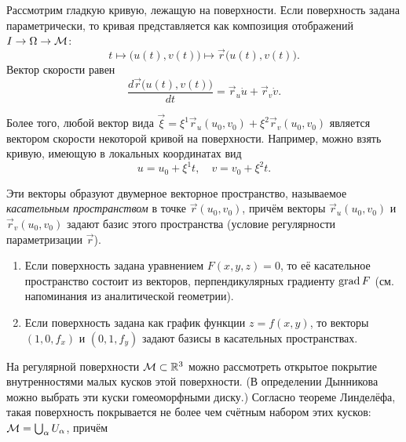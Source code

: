 Рассмотрим гладкую кривую, лежащую на поверхности. Если поверхность задана параметрически, то кривая представляется как композиция отображений $I \to \Omega \to \mathcal{M}$:
\[
	t \mapsto \big(u(t), v(t)\big) \mapsto \vec{r}\big(u(t), v(t)\big).
\]
Вектор скорости равен
\[
	\frac{d\vec{r}\big(u(t), v(t)\big)}{dt} = \vec{r}_u\dot{u} + \vec{r}_v\dot{v}.
\]

Более того, любой вектор вида $\vec{\xi} = \xi^1\vec{r}_u(u_0, v_0) + \xi^2\vec{r}_v(u_0, v_0)$ является вектором скорости некоторой кривой на поверхности. Например, можно взять кривую, имеющую в локальных координатах вид
\[
	u = u_0 + \xi^1t,\quad v = v_0 + \xi^2t.
\]

Эти векторы образуют двумерное векторное пространство, называемое \textit{касательным пространством} в точке $\vec{r}(u_0, v_0)$, причём векторы $\vec{r}_u(u_0, v_0)$ и $\vec{r}_v(u_0, v_0)$ задают базис этого пространства (условие регулярности параметризации $\vec{r}$).

\begin{example}
	\begin{enumerate}[nolistsep, label=(\arabic*)]
		\item Если поверхность задана уравнением $F(x, y, z) = 0$, то её касательное пространство состоит из векторов, перпендикулярных градиенту $\operatorname{grad} F$ (см. напоминания из аналитической геометрии).
		\item Если поверхность задана как график функции $z = f(x, y)$, то векторы $(1, 0, f_x)$ и $(0, 1, f_y)$ задают базисы в касательных пространствах.
	\end{enumerate}
\end{example}

На регулярной поверхности $\mathcal{M} \subset \mathbb{R}^3$ можно рассмотреть открытое покрытие внутренностями малых кусков этой поверхности. (В определении Дынникова можно выбрать эти куски гомеоморфными диску.) Согласно теореме Линделёфа\footnotemark, такая поверхность покрывается не более чем счётным набором этих кусков: $\mathcal{M} = \bigcup_\alpha U_\alpha$, причём


